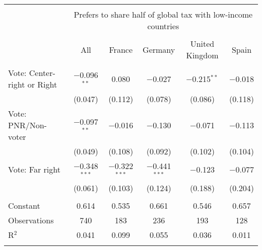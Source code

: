
\begin{tabular}{@{\extracolsep{5pt}}lccccc} 
\\[-1.8ex]\hline 
\hline \\[-1.8ex] 
 & \multicolumn{5}{c}{Prefers to share half of global tax with low-income countries} \\ 
\cline{2-6} 
\\[-1.8ex] & All & France & Germany & United Kingdom & Spain \\ 
\hline \\[-1.8ex] 
 Vote: Center-right or Right & $-$0.096$^{**}$ & 0.080 & $-$0.027 & $-$0.215$^{**}$ & $-$0.018 \\ 
  & (0.047) & (0.112) & (0.078) & (0.086) & (0.118) \\ 
  Vote: PNR/Non-voter & $-$0.097$^{**}$ & $-$0.016 & $-$0.130 & $-$0.071 & $-$0.113 \\ 
  & (0.049) & (0.108) & (0.092) & (0.102) & (0.104) \\ 
  Vote: Far right & $-$0.348$^{***}$ & $-$0.322$^{***}$ & $-$0.441$^{***}$ & $-$0.123 & $-$0.077 \\ 
  & (0.061) & (0.103) & (0.124) & (0.188) & (0.204) \\ 
 \hline \\[-1.8ex] 
Constant & 0.614 & 0.535 & 0.661 & 0.546 & 0.657 \\ 
Observations & 740 & 183 & 236 & 193 & 128 \\ 
R$^{2}$ & 0.041 & 0.099 & 0.055 & 0.036 & 0.011 \\ 
\hline 
\hline \\[-1.8ex] 
\end{tabular} 